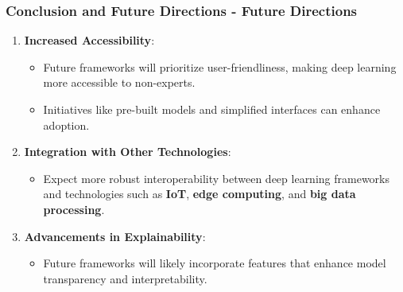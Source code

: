 \documentclass[aspectratio=169]{beamer}
\begin{document}
\begin{frame}[fragile]
    \frametitle{Conclusion and Future Directions - Future Directions}
    
    \begin{enumerate}[resume]
        \item \textbf{Increased Accessibility}:
        \begin{itemize}
            \item Future frameworks will prioritize user-friendliness, making deep learning more accessible to non-experts.
            \item Initiatives like pre-built models and simplified interfaces can enhance adoption.
        \end{itemize}

        \item \textbf{Integration with Other Technologies}:
        \begin{itemize}
            \item Expect more robust interoperability between deep learning frameworks and technologies such as \textbf{IoT}, \textbf{edge computing}, and \textbf{big data processing}.
        \end{itemize}

        \item \textbf{Advancements in Explainability}:
        \begin{itemize}
            \item Future frameworks will likely incorporate features that enhance model transparency and interpretability.
        \end{itemize}
    \end{enumerate}
\end{frame}
\end{document}
